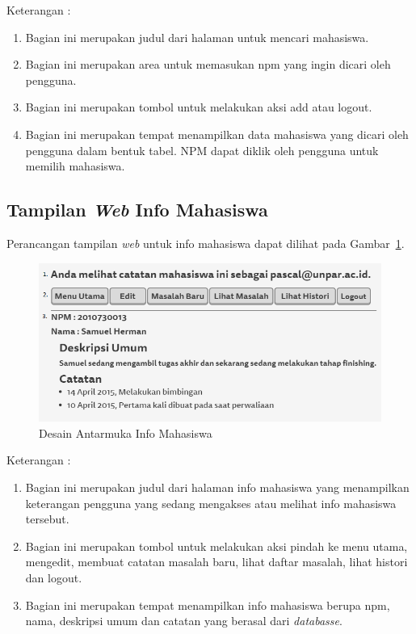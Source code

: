 Keterangan :
\begin{enumerate}[(1)]
\item
Bagian ini merupakan judul dari halaman untuk mencari mahasiswa.
\item
Bagian ini merupakan area untuk memasukan npm yang ingin dicari oleh pengguna.
\item
Bagian ini merupakan tombol untuk melakukan aksi add atau logout.
\item
Bagian ini merupakan tempat menampilkan data mahasiswa yang dicari oleh pengguna dalam bentuk tabel. NPM dapat diklik oleh pengguna untuk memilih mahasiswa.
\end{enumerate}

\subsection{Tampilan {\it Web} Info Mahasiswa}
Perancangan tampilan {\it web} untuk info mahasiswa dapat dilihat pada Gambar~\ref{fig:infomahasiswa}.
\begin{figure}[ht]
\centering
\includegraphics[scale=0.8]{Gambar/infomahasiswa.png}
\caption[Desain Antarmuka Info Mahasiswa]{Desain Antarmuka Info Mahasiswa}
\label{fig:infomahasiswa}
\end{figure}

Keterangan :
\begin{enumerate}[(1)]
\item
Bagian ini merupakan judul dari halaman info mahasiswa yang menampilkan keterangan pengguna yang sedang mengakses atau melihat info mahasiswa tersebut.
\item
Bagian ini merupakan tombol untuk melakukan aksi pindah ke menu utama, mengedit, membuat catatan masalah baru, lihat daftar masalah, lihat histori dan logout.
\item
Bagian ini merupakan tempat menampilkan info mahasiswa berupa npm, nama, deskripsi umum dan catatan yang berasal dari {\it databasse}.
\end{enumerate}

